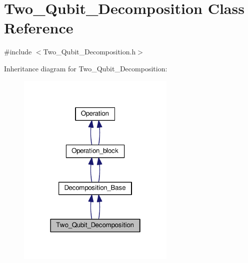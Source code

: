 \hypertarget{class_two___qubit___decomposition}{}\section{Two\+\_\+\+Qubit\+\_\+\+Decomposition Class Reference}
\label{class_two___qubit___decomposition}


{\ttfamily \#include $<$Two\+\_\+\+Qubit\+\_\+\+Decomposition.\+h$>$}



Inheritance diagram for Two\+\_\+\+Qubit\+\_\+\+Decomposition\+:
\nopagebreak
\begin{figure}[H]
\begin{center}
\leavevmode
\includegraphics[width=214pt]{class_two___qubit___decomposition__inherit__graph}
\end{center}
\end{figure}
